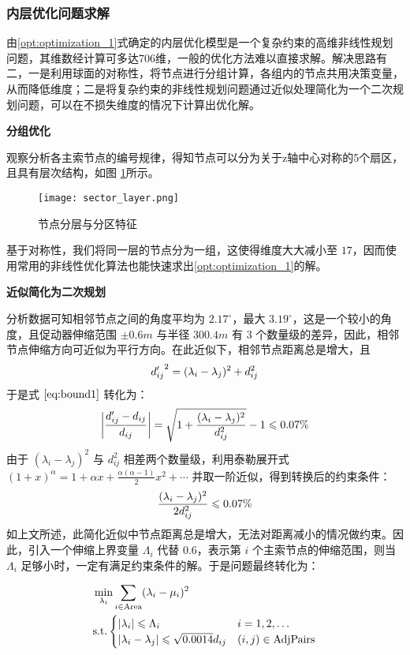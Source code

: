 \documentclass[withoutpreface,bwprint,fontset=macnew]{cumcmthesis} %
\begin{document}
	\subsubsection {内层优化问题求解}
	
		由\ref {opt:optimization_1}式确定的内层优化模型是一个复杂约束的高维非线性规划问题，其维数经计算可多达706维，一般的优化方法难以直接求解。解决思路有二，一是利用球面的对称性，将节点进行分组计算，各组内的节点共用决策变量，从而降低维度；二是将复杂约束的非线性规划问题通过近似处理简化为一个二次规划问题，可以在不损失维度的情况下计算出优化解。
		
		\textbf{分组优化}
		
		观察分析各主索节点的编号规律，得知节点可以分为关于z轴中心对称的5个扇区，且具有层次结构，如图 \ref {fig:sector_layer}所示。
		
		\begin{figure}[!h]
			\centering
			\texttt{[image: sector\_layer.png]} %
			\caption{节点分层与分区特征}
			\label{fig:sector_layer}
		\end{figure}

		基于对称性，我们将同一层的节点分为一组，这使得维度大大减小至 $17$，因而使用常用的非线性优化算法也能快速求出\ref{opt:optimization_1}的解。
		
		\textbf{近似简化为二次规划}
		
		分析数据可知相邻节点之间的角度平均为 $2.17^\circ$，最大 $3.19^\circ$，这是一个较小的角度，且促动器伸缩范围 $\pm 0.6m$ 与半径 $300.4m$ 有 $3$ 个数量级的差异，因此，相邻节点伸缩方向可近似为平行方向。在此近似下，相邻节点距离总是增大，且
		$$
		{d'_{ij}}^2=(\lambda_i-\lambda_j)^2+d_{ij}^2\notag
		$$
		于是式 $\ref{eq:bound1}$ 转化为：
		$$
		\left|\frac{d'_{ij}-d_{ij}}{d_{ij}}\right|=\sqrt{1+\frac{(\lambda_i-\lambda_j)^2}{d_{ij}^2}}-1\leqslant 0.07\%\notag
		$$
		由于 $(\lambda_i-\lambda_j)^2$ 与 $d_{ij}^2$ 相差两个数量级，利用泰勒展开式 $(1+x)^\alpha=1+\alpha x+\frac{\alpha(\alpha-1)}{2}x^2+\cdots$ 并取一阶近似，得到转换后的约束条件：
		$$
		\frac{(\lambda_i-\lambda_j)^2}{2d^2_{ij}}\leqslant 0.07\%\notag
		$$
		如上文所述，此简化近似中节点距离总是增大，无法对距离减小的情况做约束。因此，引入一个伸缩上界变量 $\Lambda_i$ 代替 $0.6$，表示第 $i$ 个主索节点的伸缩范围，则当 $\Lambda_i$ 足够小时，一定有满足约束条件的解。于是问题最终转化为：
		
		\begin{align}
			&\min_{\lambda_i} \sum_{i\in\text{Area}}(\lambda_i-\mu_i)^2\notag\\
			&\text{s.t.}\begin{cases}
					|\lambda_i|\leqslant\Lambda_i&i=1,2,\ldots\\
					|\lambda_i-\lambda_j|\leqslant \sqrt{0.0014}d_{ij}&(i,j)\in\text{AdjPairs}
					\end{cases}
		\end{align}
		
\end{document}
